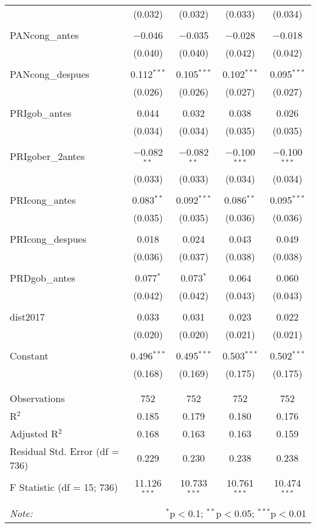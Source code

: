 \begin{table}[!htbp]
\begin{tabular}{@{\extracolsep{5pt}}lcccc}
  & (0.032) & (0.032) & (0.033) & (0.034) \\ 
  & & & & \\ 
 PANcong\_antes & $-$0.046 & $-$0.035 & $-$0.028 & $-$0.018 \\ 
  & (0.040) & (0.040) & (0.042) & (0.042) \\ 
  & & & & \\ 
 PANcong\_despues & 0.112$^{***}$ & 0.105$^{***}$ & 0.102$^{***}$ & 0.095$^{***}$ \\ 
  & (0.026) & (0.026) & (0.027) & (0.027) \\ 
  & & & & \\ 
 PRIgob\_antes & 0.044 & 0.032 & 0.038 & 0.026 \\ 
  & (0.034) & (0.034) & (0.035) & (0.035) \\ 
  & & & & \\ 
 PRIgober\_2antes & $-$0.082$^{**}$ & $-$0.082$^{**}$ & $-$0.100$^{***}$ & $-$0.100$^{***}$ \\ 
  & (0.033) & (0.033) & (0.034) & (0.034) \\ 
  & & & & \\ 
 PRIcong\_antes & 0.083$^{**}$ & 0.092$^{***}$ & 0.086$^{**}$ & 0.095$^{***}$ \\ 
  & (0.035) & (0.035) & (0.036) & (0.036) \\ 
  & & & & \\ 
 PRIcong\_despues & 0.018 & 0.024 & 0.043 & 0.049 \\ 
  & (0.036) & (0.037) & (0.038) & (0.038) \\ 
  & & & & \\ 
 PRDgob\_antes & 0.077$^{*}$ & 0.073$^{*}$ & 0.064 & 0.060 \\ 
  & (0.042) & (0.042) & (0.043) & (0.043) \\ 
  & & & & \\ 
 dist2017 & 0.033 & 0.031 & 0.023 & 0.022 \\ 
  & (0.020) & (0.020) & (0.021) & (0.021) \\ 
  & & & & \\ 
 Constant & 0.496$^{***}$ & 0.495$^{***}$ & 0.503$^{***}$ & 0.502$^{***}$ \\ 
  & (0.168) & (0.169) & (0.175) & (0.175) \\ 
  & & & & \\ 
\hline \\[-1.8ex] 
Observations & 752 & 752 & 752 & 752 \\ 
R$^{2}$ & 0.185 & 0.179 & 0.180 & 0.176 \\ 
Adjusted R$^{2}$ & 0.168 & 0.163 & 0.163 & 0.159 \\ 
Residual Std. Error (df = 736) & 0.229 & 0.230 & 0.238 & 0.238 \\ 
F Statistic (df = 15; 736) & 11.126$^{***}$ & 10.733$^{***}$ & 10.761$^{***}$ & 10.474$^{***}$ \\ 
\hline 
\hline \\[-1.8ex] 
\textit{Note:}  & \multicolumn{4}{r}{$^{*}$p$<$0.1; $^{**}$p$<$0.05; $^{***}$p$<$0.01} \\ 
\end{tabular} 
\end{table} 
